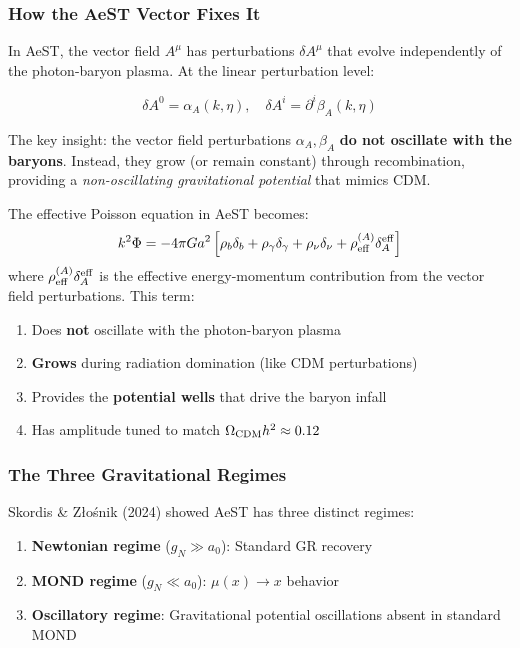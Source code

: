 \documentclass[11pt,a4paper]{article}
\begin{document}
\subsubsection{How the AeST Vector Fixes It}

In AeST, the vector field $A^\mu$ has perturbations $\delta A^\mu$ that evolve independently of the photon-baryon plasma. At the linear perturbation level:

\begin{equation}
\delta A^0 = \alpha_A(k,\eta), \quad \delta A^i = \partial^i \beta_A(k,\eta)
\end{equation}

The key insight: the vector field perturbations $\alpha_A, \beta_A$ \textbf{do not oscillate with the baryons}. Instead, they grow (or remain constant) through recombination, providing a \emph{non-oscillating gravitational potential} that mimics CDM.

The effective Poisson equation in AeST becomes:
\begin{equation}
k^2\Phi = -4\pi G a^2\left[\rho_b\delta_b + \rho_\gamma\delta_\gamma + \rho_\nu\delta_\nu + \rho_{\rm eff}^{(A)}\delta_A^{\rm eff}\right]
\end{equation}
where $\rho_{\rm eff}^{(A)}\delta_A^{\rm eff}$ is the effective energy-momentum contribution from the vector field perturbations. This term:

\begin{enumerate}
\item Does \textbf{not} oscillate with the photon-baryon plasma
\item \textbf{Grows} during radiation domination (like CDM perturbations)
\item Provides the \textbf{potential wells} that drive the baryon infall
\item Has amplitude tuned to match $\Omega_{\rm CDM}h^2 \approx 0.12$
\end{enumerate}

\subsubsection{The Three Gravitational Regimes}

Skordis \& Z{\l}o\'{s}nik (2024) showed AeST has three distinct regimes:

\begin{enumerate}
\item \textbf{Newtonian regime} ($g_N \gg a_0$): Standard GR recovery
\item \textbf{MOND regime} ($g_N \ll a_0$): $\mu(x) \to x$ behavior
\item \textbf{Oscillatory regime}: Gravitational potential oscillations absent in standard MOND
\end{enumerate}
\end{document}

